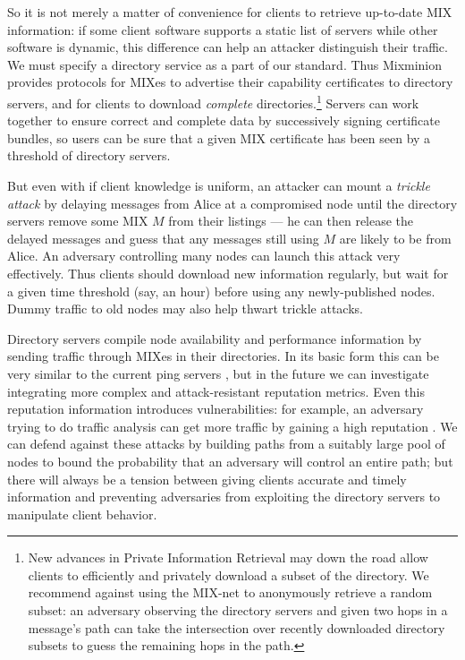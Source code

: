 \documentclass{llncs}
\begin{document}
So it is not merely a matter of convenience for clients to retrieve
up-to-date MIX information: if some client software supports a static
list of servers while other software is dynamic, this difference can
help an attacker distinguish their traffic. We must specify a directory
service as a part of our standard. Thus Mixminion provides protocols for
MIXes to advertise their capability certificates to directory servers,
and for clients to download \emph{complete} directories.\footnote{
  New advances in Private Information Retrieval \cite{malkin-thesis}
  may down 
  the
  road allow clients to efficiently and privately download a subset of
  the directory. We recommend against using the MIX-net to anonymously
  retrieve a random subset: an adversary observing the directory servers
  and given two hops in a message's path can take the intersection over
  recently downloaded directory subsets to guess the remaining hops in
  the path.}
Servers can work together to ensure correct and complete data by
successively signing certificate bundles, so users can be sure that a
given MIX certificate has been seen by a threshold of directory servers.

But even with if client knowledge is uniform, an attacker can mount a
\emph{trickle attack} by delaying messages from Alice at a compromised
node until the directory servers remove some MIX $M$ from their listings
--- he can then release the delayed messages and guess that any messages
still using $M$ are likely to be from Alice. An adversary controlling
many nodes can launch this attack very effectively. Thus clients
should download new information regularly,
but wait for a given time threshold (say, an hour) before using any
newly-published nodes. Dummy traffic to old nodes may also 
help thwart trickle attacks.

Directory servers compile node availability and performance information by
sending traffic through MIXes in their directories. In its basic form this
can be very similar to the current ping servers \cite{levien}, but in the
future we can investigate integrating more complex and attack-resistant
reputation metrics.   Even this reputation information introduces
vulnerabilities: for example, an adversary 
trying to do traffic analysis
can get more traffic by gaining a high reputation \cite{mix-acc}. We can
defend against these attacks by building paths from a suitably large pool
of nodes \cite{casc-rep} to bound the probability that an adversary will
control an entire path; but there will always be a tension between giving
clients accurate and timely information and preventing adversaries from
exploiting the directory servers to manipulate client behavior.
\end{document}
